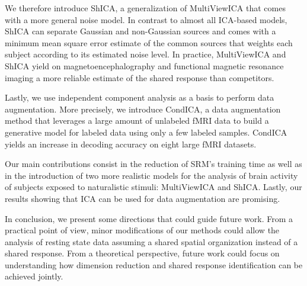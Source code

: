 We therefore introduce ShICA, a generalization of MultiViewICA that comes with a more general noise model. In contrast to almost all ICA-based models, ShICA can separate Gaussian and non-Gaussian sources and comes with a minimum mean square error estimate of the common sources that weights each subject according to its estimated noise level.
In practice, MultiViewICA and ShICA yield on magnetoencephalography and functional magnetic resonance imaging a more reliable estimate
of the shared response than competitors.

Lastly, we use independent component analysis as a basis to perform data augmentation.  More precisely, we introduce CondICA, a data augmentation method that leverages a large amount of unlabeled fMRI data to build a generative model for labeled data using only a few labeled samples. CondICA yields an increase in decoding accuracy on eight large fMRI datasets.

Our main contributions consist in the reduction of SRM's training time as well as in the introduction of two more realistic models for the analysis of brain activity of subjects exposed to naturalistic stimuli: MultiViewICA and ShICA. Lastly, our results showing that ICA can be used for data augmentation are promising.

In conclusion, we present some directions that could guide future work. From a
practical point of view, minor modifications of our methods could allow the
analysis of resting state data assuming a shared spatial organization instead of a shared response. From a theoretical perspective, future work could focus on understanding how dimension reduction and shared response identification can be achieved jointly.
\pagebreak 

